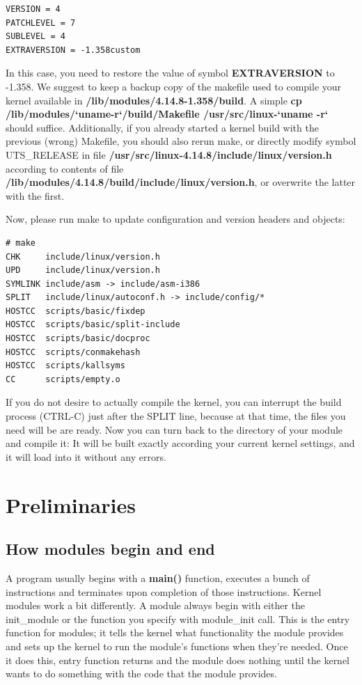 \documentclass[11pt]{article}
\begin{document}
\begin{verbatim}
VERSION = 4
PATCHLEVEL = 7
SUBLEVEL = 4
EXTRAVERSION = -1.358custom
\end{verbatim}

In this case, you need to restore the value of symbol \textbf{EXTRAVERSION} to -1.358. We suggest to keep a backup copy of the makefile used to compile your kernel available in \textbf{/lib/modules/4.14.8-1.358/build}. A simple \textbf{cp /lib/modules/`uname-r`/build/Makefile /usr/src/linux-`uname -r`} should suffice. Additionally, if you already started a kernel build with the previous (wrong) Makefile, you should also rerun make, or directly modify symbol UTS\_RELEASE in file \textbf{/usr/src/linux-4.14.8/include/linux/version.h} according to contents of file \textbf{/lib/modules/4.14.8/build/include/linux/version.h}, or overwrite the latter with the first.

Now, please run make to update configuration and version headers and objects:

\begin{verbatim}
# make
CHK     include/linux/version.h
UPD     include/linux/version.h
SYMLINK include/asm -> include/asm-i386
SPLIT   include/linux/autoconf.h -> include/config/*
HOSTCC  scripts/basic/fixdep
HOSTCC  scripts/basic/split-include
HOSTCC  scripts/basic/docproc
HOSTCC  scripts/conmakehash
HOSTCC  scripts/kallsyms
CC      scripts/empty.o
\end{verbatim}

If you do not desire to actually compile the kernel, you can interrupt the build process (CTRL-C) just after the SPLIT line, because at that time, the files you need will be are ready. Now you can turn back to the directory of your module and compile it: It will be built exactly according your current kernel settings, and it will load into it without any errors.

\section*{Preliminaries}
\label{sec:orgb3efe20}
\subsection*{How modules begin and end}
\label{sec:org481504d}
A program usually begins with a \textbf{main()} function, executes a bunch of instructions and terminates upon completion of those instructions. Kernel modules work a bit differently. A module always begin with either the init\_module or the function you specify with module\_init call. This is the entry function for modules; it tells the kernel what functionality the module provides and sets up the kernel to run the module's functions when they're needed. Once it does this, entry function returns and the module does nothing until the kernel wants to do something with the code that the module provides.
\end{document}
